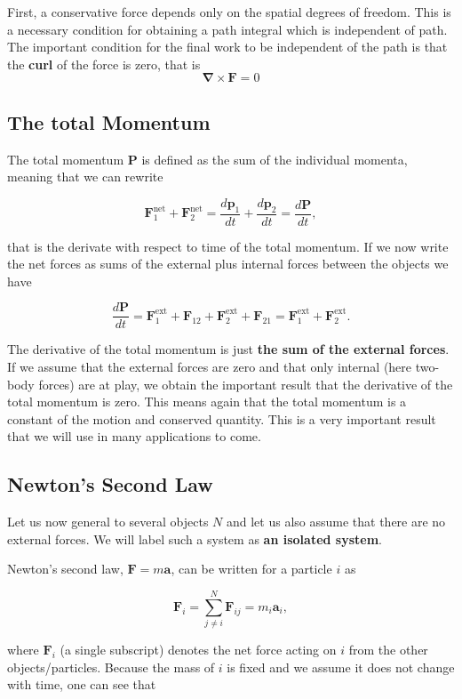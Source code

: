 \documentclass[%
oneside,                 %
final,                   %
10pt]{article}
\begin{document}
First, a conservative force depends only on the spatial degrees of freedom. This is a necessary condition for obtaining a path integral which is independent of path.
The  important condition for the final work to be independent of the path is that the \textbf{curl} of the force is zero, that
is
\[
\bm{\nabla} \times \bm{F}=0
\]

\subsection*{The total Momentum}

The total momentum $\bm{P}$ is defined as the sum of the individual momenta, meaning that we can rewrite

\[
\bm{F}_1^{\mathrm{net}}+\bm{F}_2^{\mathrm{net}}=\frac{d\bm{p}_1}{dt}+\frac{d\bm{p}_2}{dt}=\frac{d\bm{P}}{dt},
\]

that is the derivate with respect to time of the total momentum. If we now
write the net forces as sums of the external plus internal forces
between the objects we have

\[
\frac{d\bm{P}}{dt}=\bm{F}_1^{\mathrm{ext}}+\bm{F}_{12}+\bm{F}_2^{\mathrm{ext}}+\bm{F}_{21}=\bm{F}_1^{\mathrm{ext}}+\bm{F}_2^{\mathrm{ext}}.
\]

The derivative of the total momentum is just \textbf{the sum of the external
forces}. If we assume that the external forces are zero and that only
internal (here two-body forces) are at play, we obtain the important
result that the derivative of the total momentum is zero. This means
again that the total momentum is a constant of the motion and
conserved quantity. This is a very important result that we will use
in many applications to come.

\subsection*{Newton's Second Law}

Let us now general to several objects $N$ and let us also assume that there are no external forces. We will label such a system as \textbf{an isolated system}. 

Newton's second law, $\bm{F}=m\bm{a}$, can be written for a particle $i$ as

\begin{equation}
\bm{F}_i=\sum_{j\ne i}^N \bm{F}_{ij}=m_i\bm{a}_i,
\end{equation}

where $\bm{F}_i$ (a single subscript) denotes the net force acting on $i$ from the other objects/particles.
Because the mass of $i$ is fixed and we assume it does not change with time, one can see that
\end{document}
